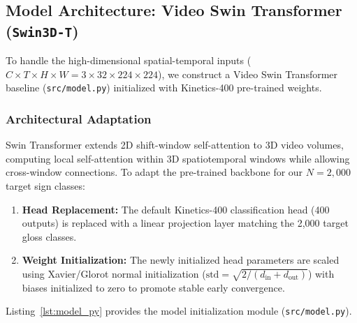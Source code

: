 \documentclass[12pt,a4paper]{article}
\begin{document}
\subsection{Model Architecture: Video Swin Transformer (\texttt{Swin3D-T})}

To handle the high-dimensional spatial-temporal inputs ($C \times T \times H \times W = 3 \times 32 \times 224 \times 224$), we construct a Video Swin Transformer baseline (\texttt{src/model.py}) initialized with Kinetics-400 pre-trained weights.

\subsubsection{Architectural Adaptation}
Swin Transformer extends 2D shift-window self-attention to 3D video volumes, computing local self-attention within 3D spatiotemporal windows while allowing cross-window connections. To adapt the pre-trained backbone for our $N = 2,000$ target sign classes:
\begin{enumerate}
    \item \textbf{Head Replacement:} The default Kinetics-400 classification head (400 outputs) is replaced with a linear projection layer matching the 2,000 target gloss classes.
    \item \textbf{Weight Initialization:} The newly initialized head parameters are scaled using Xavier/Glorot normal initialization ($\text{std} = \sqrt{2 / (d_{\text{in}} + d_{\text{out}})}$) with biases initialized to zero to promote stable early convergence.
\end{enumerate}

Listing~\ref{lst:model_py} provides the model initialization module (\texttt{src/model.py}).
\end{document}
